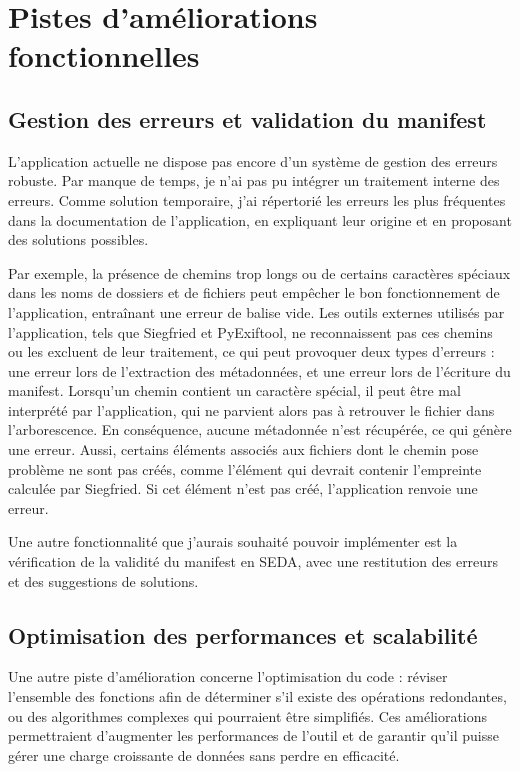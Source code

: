 \section{Pistes d'améliorations fonctionnelles}

\subsection*{Gestion des erreurs et validation du manifest}

L'application actuelle ne dispose pas encore d'un système de gestion des erreurs robuste. Par manque de temps, je n'ai pas pu intégrer un traitement interne des erreurs. Comme solution temporaire, j'ai répertorié les erreurs les plus fréquentes dans la documentation de l'application, en expliquant leur origine et en proposant des solutions possibles.

Par exemple, la présence de chemins trop longs ou de certains caractères spéciaux dans les noms de dossiers et de fichiers peut empêcher le bon fonctionnement de l'application, entraînant une erreur de balise vide. Les outils externes utilisés par l'application, tels que Siegfried et PyExiftool, ne reconnaissent pas ces chemins ou les excluent de leur traitement, ce qui peut provoquer deux types d'erreurs : une erreur lors de l'extraction des métadonnées, et une erreur lors de l'écriture du manifest. Lorsqu'un chemin contient un caractère spécial, il peut être mal interprété par l'application, qui ne parvient alors pas à retrouver le fichier dans l'arborescence. En conséquence, aucune métadonnée n'est récupérée, ce qui génère une erreur. Aussi, certains éléments associés aux fichiers dont le chemin pose problème ne sont pas créés, comme l'élément  qui devrait contenir l'empreinte calculée par Siegfried. Si cet élément n'est pas créé, l'application renvoie une erreur.

Une autre fonctionnalité que j'aurais souhaité pouvoir implémenter est la vérification de la validité du manifest en SEDA, avec une restitution des erreurs et des suggestions de solutions.

\subsection*{Optimisation des performances et scalabilité}

Une autre piste d'amélioration concerne l'optimisation du code : réviser l'ensemble des fonctions afin de déterminer s'il existe des opérations redondantes, ou des algorithmes complexes qui pourraient être simplifiés. Ces améliorations permettraient d'augmenter les performances de l'outil et de garantir qu'il puisse gérer une charge croissante de données sans perdre en efficacité.

